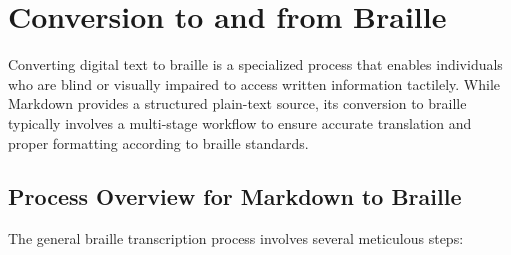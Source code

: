 \section{Conversion to and from Braille}

Converting digital text to braille is a specialized process that enables individuals who are blind or visually impaired to access written information tactilely. While Markdown provides a structured plain-text source, its conversion to braille typically involves a multi-stage workflow to ensure accurate translation and proper formatting according to braille standards.

\subsection{Process Overview for Markdown to Braille}
The general braille transcription process involves several meticulous steps:

